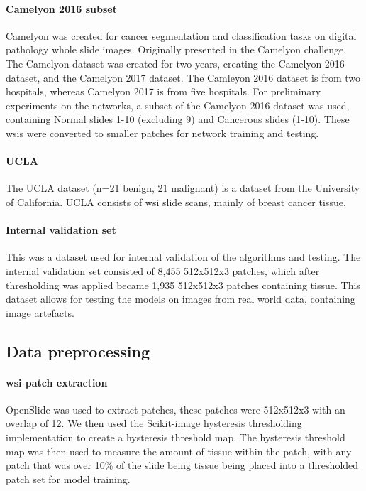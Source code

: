 \documentclass[review]{elsarticle}
\begin{document}
\paragraph{Camelyon 2016 subset} Camelyon was created for cancer segmentation and classification tasks on digital pathology whole slide images. Originally presented in the Camelyon challenge. The Camelyon dataset was created for two years, creating the Camelyon 2016 dataset, and the Camelyon 2017 dataset. The Camleyon 2016 dataset is from two hospitals, whereas Camelyon 2017 is from five hospitals. For preliminary experiments on the networks, a subset of the Camelyon 2016 dataset was used, containing Normal slides 1-10 (excluding 9) and Cancerous slides (1-10). These \glspl{wsi} were converted to smaller patches for network training and testing.

\paragraph{UCLA} The UCLA dataset (n=21 benign, 21 malignant) is a dataset from the University of California. UCLA consists of \gls{wsi} slide scans, mainly of breast cancer tissue.

\paragraph{Internal validation set} This was a dataset used for internal validation of the algorithms and testing. The internal validation set consisted of 8,455 512x512x3 patches, which after thresholding was applied became 1,935 512x512x3 patches containing tissue. This dataset allows for testing the models on images from real world data, containing image artefacts.

\subsection{Data preprocessing}
\paragraph{\gls{wsi} patch extraction} OpenSlide was used to extract patches, these patches were 512x512x3 with an overlap of 12. We then used the Scikit-image hysteresis thresholding implementation to create a hysteresis threshold map. The hysteresis threshold map was then used to measure the amount of tissue within the patch, with any patch that was over 10\% of the slide being tissue being placed into a thresholded patch set for model training.
\end{document}
